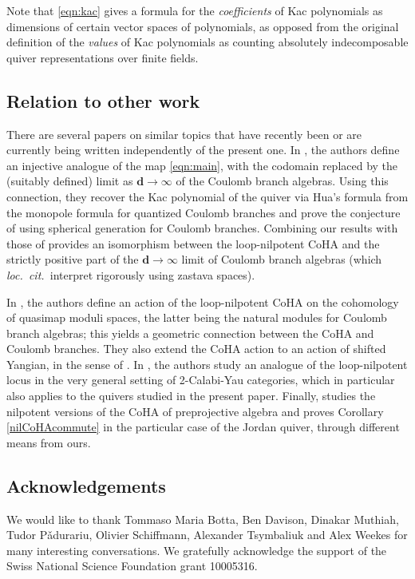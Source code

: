 \documentclass{amsart}
\def\bd{{\mathbf{d}}}
\def\loccit{\emph{loc.~cit.~}}
\begin{document}
\medskip 

\noindent Note that \eqref{eqn:kac} gives a formula for the \emph{coefficients} of Kac polynomials as dimensions of certain vector spaces of polynomials, as opposed from the original definition of the \emph{values} of Kac polynomials as counting absolutely indecomposable quiver representations over finite fields.

\medskip 

\subsection{Relation to other work}

There are several papers on similar topics that have recently been or are currently being written independently of the present one. In \cite{MW}, the authors define an injective analogue of the map \eqref{eqn:main}, with the codomain replaced by the (suitably defined) limit as $\bd \rightarrow \infty$ of the Coulomb branch algebras. Using this connection, they recover the Kac polynomial of the quiver via Hua's formula from the monopole formula for quantized Coulomb branches and prove the conjecture of \cite{NGen} using spherical generation for Coulomb branches. Combining our results with those of \cite{MW} provides an isomorphism between the loop-nilpotent CoHA and the strictly positive part of the $\bd \rightarrow \infty$ limit of Coulomb branch algebras (which \loccit interpret rigorously using zastava spaces).

\medskip 

In \cite{BT}, the authors define an action of the loop-nilpotent CoHA on the cohomology of quasimap moduli spaces, the latter being the natural modules for Coulomb branch algebras; this yields a geometric connection between the CoHA and Coulomb branches. They also extend the CoHA action to an action of shifted Yangian, in the sense of \cite{cao2026shiftedquantumgroupscritical}. In \cite[Section 2.3]{DHKSV}, the authors study an analogue of the loop-nilpotent locus in the very general setting of 2-Calabi-Yau categories, which in particular also applies to the quivers studied in the present paper. Finally, \cite{H} studies the nilpotent versions of the CoHA of preprojective algebra and proves Corollary \ref{nilCoHAcommute} in the particular case of the Jordan quiver, through different means from ours.

\medskip

\subsection{Acknowledgements} We would like to thank Tommaso Maria Botta, Ben Davison, Dinakar Muthiah, Tudor Pǎdurariu, Olivier Schiffmann, Alexander Tsymbaliuk and Alex Weekes for many interesting conversations. We gratefully acknowledge the support of the Swiss National Science Foundation grant 10005316.
\end{document}
